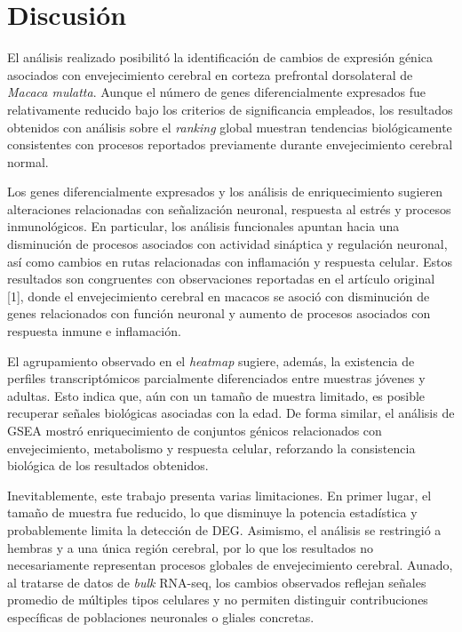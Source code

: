 \documentclass[
  12pt,
  letterpaper,
  DIV=11,
  numbers=noendperiod]{scrartcl}
\begin{document}
\section{Discusión}\label{discusiuxf3n}

El análisis realizado posibilitó la identificación de cambios de
expresión génica asociados con envejecimiento cerebral en corteza
prefrontal dorsolateral de \emph{Macaca mulatta}. Aunque el número de
genes diferencialmente expresados fue relativamente reducido bajo los
criterios de significancia empleados, los resultados obtenidos con
análisis sobre el \emph{ranking} global muestran tendencias
biológicamente consistentes con procesos reportados previamente durante
envejecimiento cerebral normal.

Los genes diferencialmente expresados y los análisis de enriquecimiento
sugieren alteraciones relacionadas con señalización neuronal, respuesta
al estrés y procesos inmunológicos. En particular, los análisis
funcionales apuntan hacia una disminución de procesos asociados con
actividad sináptica y regulación neuronal, así como cambios en rutas
relacionadas con inflamación y respuesta celular. Estos resultados son
congruentes con observaciones reportadas en el artículo original
{[}1{]}, donde el envejecimiento cerebral en macacos se asoció con
disminución de genes relacionados con función neuronal y aumento de
procesos asociados con respuesta inmune e inflamación.

El agrupamiento observado en el \emph{heatmap} sugiere, además, la
existencia de perfiles transcriptómicos parcialmente diferenciados entre
muestras jóvenes y adultas. Esto indica que, aún con un tamaño de
muestra limitado, es posible recuperar señales biológicas asociadas con
la edad. De forma similar, el análisis de GSEA mostró enriquecimiento de
conjuntos génicos relacionados con envejecimiento, metabolismo y
respuesta celular, reforzando la consistencia biológica de los
resultados obtenidos.

Inevitablemente, este trabajo presenta varias limitaciones. En primer
lugar, el tamaño de muestra fue reducido, lo que disminuye la potencia
estadística y probablemente limita la detección de DEG. Asimismo, el
análisis se restringió a hembras y a una única región cerebral, por lo
que los resultados no necesariamente representan procesos globales de
envejecimiento cerebral. Aunado, al tratarse de datos de \emph{bulk}
RNA-seq, los cambios observados reflejan señales promedio de múltiples
tipos celulares y no permiten distinguir contribuciones específicas de
poblaciones neuronales o gliales concretas.
\end{document}
